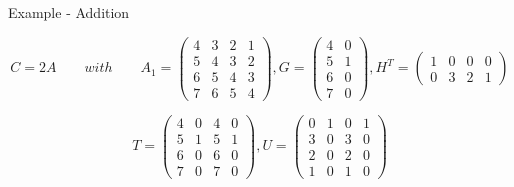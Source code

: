 \begin{frame}{Example - Addition}
    
    \[
        C = 2A\qquad with \qquad A_{1} = \begin{pmatrix}
        4 & 3 & 2 & 1 \\
        5 & 4 & 3 & 2 \\
        6 & 5 & 4 & 3 \\
        7 & 6 & 5 & 4
    \end{pmatrix}, G =
            \begin{pmatrix}
                4 & 0 \\
                5 & 1 \\
                6 & 0 \\
                7 & 0
            \end{pmatrix}
            ,
            H^{T} =
            \begin{pmatrix}
                1 & 0 & 0 & 0 \\
                0 & 3 & 2 & 1
            \end{pmatrix}
    \]
    
    \vspace{0.5em}
    
    \[
       T =
        \begin{pmatrix}
            4 & 0 & 4 & 0 \\
            5 & 1 & 5 & 1 \\
            6 & 0 & 6 & 0 \\
            7 & 0 & 7 & 0
        \end{pmatrix}
        , U = 
        \begin{pmatrix}
            0 & 1 & 0 & 1 \\
            3 & 0 & 3 & 0 \\
            2 & 0 & 2 & 0 \\
            1 & 0 & 1 & 0
        \end{pmatrix}
    \]
    
    
\end{frame}
